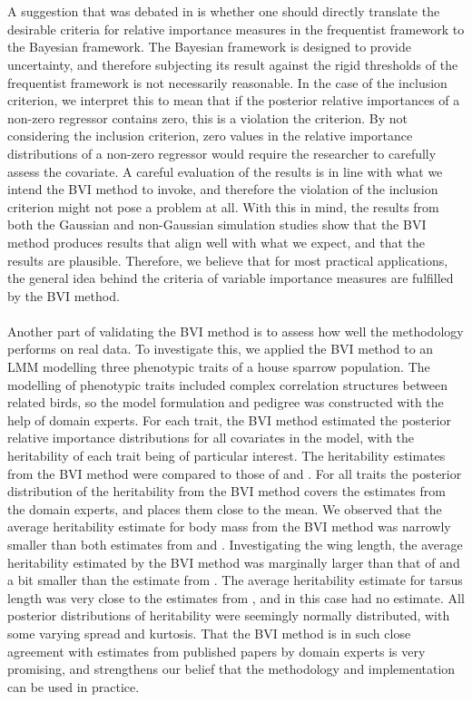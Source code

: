 \\
\\
A suggestion that was debated in \citep{Arnstad:Relative_variable_importance_in_Bayesian_linear_mixed_models:2024} is whether one should directly translate the desirable criteria for relative importance measures in the frequentist framework to the Bayesian framework. The Bayesian framework is designed to provide uncertainty, and therefore subjecting its result against the rigid thresholds of the frequentist framework is not necessarily reasonable. In the case of the inclusion criterion, we interpret this to mean that if the posterior relative importances of a non-zero regressor contains zero, this is a violation the criterion. By not considering the inclusion criterion, zero values in the relative importance distributions of a non-zero regressor would require the researcher to carefully assess the covariate. A careful evaluation of the results is in line with what we intend the BVI method to invoke, and therefore the violation of the inclusion criterion might not pose a problem at all. With this in mind, the results from both the Gaussian and non-Gaussian simulation studies show that the BVI method produces results that align well with what we expect, and that the results are plausible. Therefore, we believe that for most practical applications, the general idea behind the criteria of variable importance measures are fulfilled by the BVI method. 
\\
\\
Another part of validating the BVI method is to assess how well the methodology performs on real data. To investigate this, we applied the BVI method to an LMM modelling three phenotypic traits of a house sparrow population. The modelling of phenotypic traits included complex correlation structures between related birds, so the model formulation and pedigree was constructed with the help of domain experts. For each trait, the BVI method estimated the posterior relative importance distributions for all covariates in the model, with the heritability of each trait being of particular interest. The heritability estimates from the BVI method were compared to those of \citet{Silva2017} and \citet{Muff2019Genetic}. For all traits the posterior distribution of the heritability from the BVI method covers the estimates from the domain experts, and places them close to the mean. We observed that the average heritability estimate for body mass from the BVI method was narrowly smaller than both estimates from \citet{Silva2017} and \citet{Muff2019Genetic}. Investigating the wing length, the average heritability estimated by the BVI method was marginally larger than that of \citet{Muff2019Genetic} and a bit smaller than the estimate from \citet{Silva2017}. The average heritability estimate for tarsus length was very close to the estimates from \citet{Silva2017}, and in this case \citet{Muff2019Genetic} had no estimate. All posterior distributions of heritability were seemingly normally distributed, with some varying spread and kurtosis. That the BVI method is in such close agreement with estimates from published papers by domain experts is very promising, and strengthens our belief that the methodology and implementation can be used in practice.
